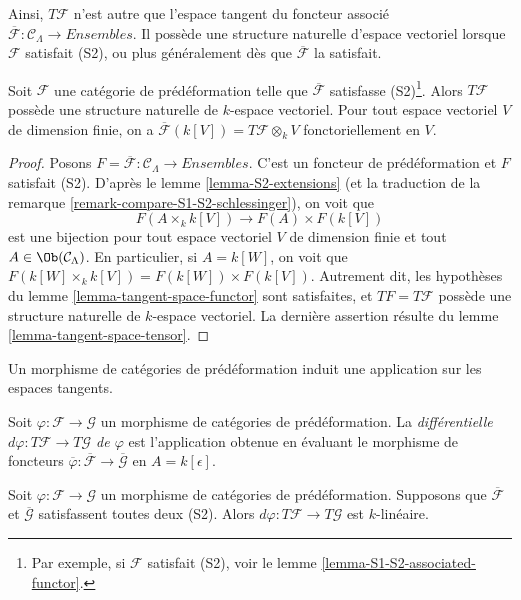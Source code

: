 \noindent
Ainsi, $T \mathcal{F}$ n'est autre que l'espace tangent du foncteur associé
$\overline{\mathcal{F}}: \mathcal{C}_\Lambda \to \textit{Ensembles}$. Il possède
une structure naturelle d'espace vectoriel lorsque $\mathcal{F}$ satisfait
(S2), ou plus généralement dès que $\overline{\mathcal{F}}$ la satisfait.

\begin{lemma}
\label{lemma-tangent-space-vector-space}
Soit $\mathcal{F}$ une catégorie de prédéformation telle que
$\overline{\mathcal{F}}$ satisfasse (S2)\footnote{Par exemple, si
$\mathcal{F}$ satisfait (S2), voir le lemme
\ref{lemma-S1-S2-associated-functor}.}. Alors $T \mathcal{F}$ possède une
structure naturelle de $k$-espace vectoriel. Pour tout espace vectoriel $V$
de dimension finie, on a
$\overline{\mathcal{F}}(k[V]) = T\mathcal{F} \otimes_k V$
fonctoriellement en $V$.
\end{lemma}

\begin{proof}
Posons
$F = \overline{\mathcal{F}} : \mathcal{C}_\Lambda \to \textit{Ensembles}$.
C'est un foncteur de prédéformation et $F$ satisfait (S2). D'après le lemme
\ref{lemma-S2-extensions} (et la traduction de la remarque
\ref{remark-compare-S1-S2-schlessinger}), on voit que
$$
F(A \times_k k[V]) \longrightarrow F(A) \times F(k[V])
$$
est une bijection pour tout espace vectoriel $V$ de dimension finie et tout
$A \in \Ob(\mathcal{C}_\Lambda)$. En particulier, si $A = k[W]$, on voit que
$F(k[W] \times_k k[V]) = F(k[W]) \times F(k[V])$. Autrement dit, les
hypothèses du lemme \ref{lemma-tangent-space-functor} sont satisfaites, et
$TF = T \mathcal{F}$ possède une structure naturelle de $k$-espace
vectoriel. La dernière assertion résulte du lemme
\ref{lemma-tangent-space-tensor}.
\end{proof}

\noindent
Un morphisme de catégories de prédéformation induit une application sur les
espaces tangents.

\begin{definition}
\label{definition-differential}
Soit $\varphi : \mathcal{F} \to \mathcal{G}$ un morphisme de catégories de
prédéformation. La {\it différentielle
$d \varphi : T \mathcal{F} \to T \mathcal{G}$ de $\varphi$} est l'application
obtenue en évaluant le morphisme de foncteurs
$\overline{\varphi}: \overline{\mathcal{F}} \to \overline{\mathcal{G}}$ en
$A = k[\epsilon]$.
\end{definition}

\begin{lemma}
\label{lemma-k-linear-differential}
Soit $\varphi : \mathcal{F} \to \mathcal{G}$ un morphisme de catégories de
prédéformation. Supposons que $\overline{\mathcal{F}}$ et
$\overline{\mathcal{G}}$ satisfassent toutes deux (S2). Alors
$d \varphi : T \mathcal{F} \to T \mathcal{G}$ est $k$-linéaire.
\end{lemma}

